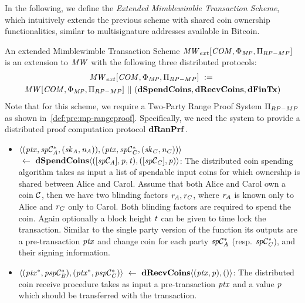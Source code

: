 In the following, we define the \emph{Extended Mimblewimble Transaction Scheme}, which intuitively extends the previous scheme with shared coin ownership functionalities, similar to multisignature addresses available in Bitcoin.

\begin{definition}
    \label{def:atom:ext-mw-tx-scheme}
    An extended Mimblewimble Transaction Scheme $\mathit{MW}_{ext}[\mathit{COM},\Phi_{\mathit{MP}},\Pi_{RP-MP}]$ is an extension to $\mathit{MW}$ with the following three distributed protocols:
    \begin{gather*}
        \mathit{MW}_{ext}[\mathit{COM},\Phi_{\mathit{MP}},\Pi_{RP-MP}] ~:=~ \\ \mathit{MW}[\mathit{COM},\Phi_{\mathit{MP}},\Pi_{RP-MP}] ~||~ (\mathbf{dSpendCoins},\mathbf{dRecvCoins}, \mathbf{dFinTx})
    \end{gather*}
    Note that for this scheme, we require a Two-Party Range Proof System $\Pi_{RP-MP}$ as shown in~\cref{def:pre:mp-rangeproof}.
    Specifically, we need the system to provide a distributed proof computation protocol $\mathbf{dRanPrf}$.
    \begin{itemize}
        \item $\langle (\mathit{ptx}, \mathit{sp}\mathcal{C}_{\mathit{A}}^*, (\mathit{sk}_{\mathit{A}},\mathit{\mathit{n}_{\mathit{A}}})), (\mathit{ptx}, \mathit{sp}\mathcal{C}_{\mathit{C}}^*, (\mathit{sk}_{\mathit{C}},\mathit{\mathit{n}_{\mathit{C}}})) \rangle$ \\
        $~\leftarrow~ \mathbf{dSpendCoins} \langle ([\mathit{sp}\mathcal{C}_{\mathit{A}}],\mathit{p},\mathit{t}), ([\mathit{sp}\mathcal{C}_{\mathit{C}}],\mathit{p}) \rangle$:
        The distributed coin spending algorithm takes as input a list of spendable input coins for which ownership is shared between Alice and Carol.
        Assume that both Alice and Carol own a coin $\mathcal{C}$, then we have two blinding factors $\mathit{r}_{\mathit{A}}, \mathit{r}_{\mathit{C}}$, where $\mathit{r}_{\mathit{A}}$ is known only to Alice and $\mathit{r}_{\mathit{C}}$ only to Carol.
        Both blinding factors are required to spend the coin.
        Again optionally a block height $\mathit{t}$ can be given to time lock the transaction.
        Similar to the single party version of the function its outputs are a pre-transaction $\mathit{ptx}$ and change coin for each party $\mathit{sp}\mathcal{C}_{\mathit{A}}^*$ (resp. $\mathit{sp}\mathcal{C}_{\mathit{C}}^*$), and their signing information.
        \item $\langle (\mathit{ptx}^*, \mathit{psp}\mathcal{C}_{\mathit{B}}^*), (\mathit{ptx}^*, \mathit{psp}\mathcal{C}_{\mathit{C}}^*) \rangle ~\leftarrow~ \mathbf{dRecvCoins} \langle(\mathit{ptx},\mathit{p}), () \rangle$: The distributed coin receive procedure takes as input a pre-transaction $\mathit{ptx}$ and a value $\mathit{p}$ which should be transferred with the transaction.

\end{itemize}
\end{definition}
